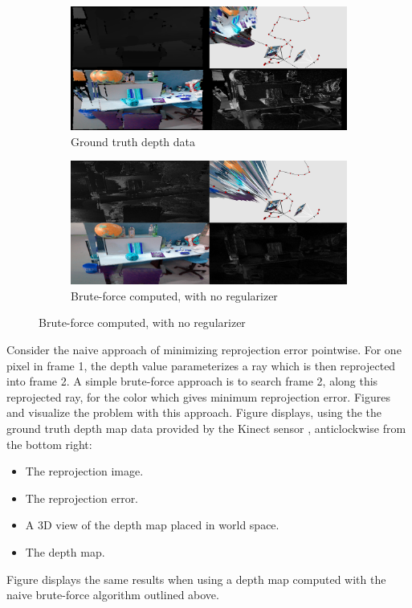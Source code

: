 \documentclass[conference]{IEEEtran}
\begin{document}
\begin{figure}[htbp]
\begin{subfigure}[b]{0.5\textwidth}
\centerline{\includegraphics[width=\textwidth]{figures/noisevis_groundtruth.png}}
\caption{Ground truth depth data}
\label{noisevis_groundtruth}
\end{subfigure}
\begin{subfigure}[b]{0.5\textwidth}
\centerline{\includegraphics[width=\textwidth]{figures/noisevis_computed.png}}
\caption{Brute-force computed, with no regularizer}
\label{noisevis_computed}
\end{subfigure}
\end{figure}

Consider the naive approach of minimizing reprojection error pointwise. For one pixel in frame 1, the depth value parameterizes a ray which
is then reprojected into frame 2. A simple brute-force approach is to search frame 2, along this reprojected ray, for the color which gives minimum
reprojection error.
Figures \cite{noisevis_groundtruth} and \cite{noisevis_computed} visualize the problem with this approach.
Figure \cite{noisevis_groundtruth} displays, using the the ground truth depth map data provided by the Kinect sensor \cite{tum_dataset}, anticlockwise
from the bottom right:
\begin{itemize}
    \item The reprojection image.
    \item The reprojection error.
    \item A 3D view of the depth map placed in world space.
    \item The depth map.
\end{itemize}
Figure \cite{noisevis_computed} displays the same results when using a depth map computed with the naive brute-force algorithm outlined above.
\end{document}

